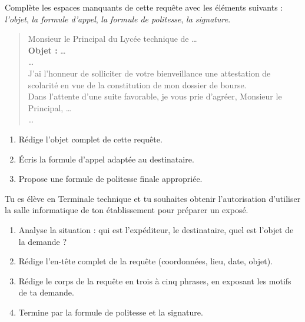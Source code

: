 \documentclass[11pt]{article}
\begin{document}
\begin{exercice}
Complète les espaces manquants de cette requête avec les éléments suivants : \emph{l'objet}, \emph{la formule d'appel}, \emph{la formule de politesse}, \emph{la signature}.

\begin{quote}
Monsieur le Principal du Lycée technique de \ldots \\
\vspace{0.2cm}
\textbf{Objet :} \ldots \\
\vspace{0.2cm}
\ldots \\
J'ai l'honneur de solliciter de votre bienveillance une attestation de scolarité en vue de la constitution de mon dossier de bourse. \\
\vspace{0.2cm}
Dans l'attente d'une suite favorable, je vous prie d'agréer, Monsieur le Principal, \ldots \\
\vspace{0.2cm}
\ldots
\end{quote}

\begin{enumerate}
\item Rédige l'objet complet de cette requête.
\item Écris la formule d'appel adaptée au destinataire.
\item Propose une formule de politesse finale appropriée.
\end{enumerate}
\end{exercice}

\begin{exercice}
Tu es élève en Terminale technique et tu souhaites obtenir l'autorisation d'utiliser la salle informatique de ton établissement pour préparer un exposé.
\begin{enumerate}
\item Analyse la situation : qui est l'expéditeur, le destinataire, quel est l'objet de la demande ?
\item Rédige l'en-tête complet de la requête (coordonnées, lieu, date, objet).
\item Rédige le corps de la requête en trois à cinq phrases, en exposant les motifs de ta demande.
\item Termine par la formule de politesse et la signature.
\end{enumerate}
\end{exercice}
\end{document}
